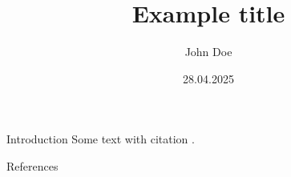 \documentclass[aspectratio=169, 10pt]{beamer}
\title{Example title}
\author{John Doe}
\institute{
    \vspace{2.5cm}
    Wrocław University of Science and Technology\\
    Advanced AI
}
\date{28.04.2025}
\begin{document}
\begin{frame}[nofootline]
  \maketitle
\end{frame}

\begin{frame}{Introduction}
  Some text with citation \cite{pontillo2024}.
\end{frame}


\renewcommand{\bibsection}{}
\begin{frame}{References}
  
  \scriptsize
  
\end{frame}
\end{document}

